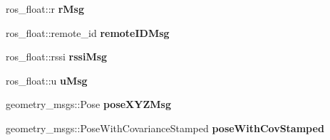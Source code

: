 \begin{DoxyCompactItemize}
\mbox{\label{classUSBL__reader_af8f9a03e453ff6a2e890854a1ac7b40f}} 
ros\+\_\+float\+::r {\bfseries r\+Msg}
\item 
\mbox{\label{classUSBL__reader_a3a9b97cb18160e7aa01631f7f48055d1}} 
ros\+\_\+float\+::remote\+\_\+id {\bfseries remote\+I\+D\+Msg}
\item 
\mbox{\label{classUSBL__reader_ad0dce9112f8e2dcb78255e4a584e321d}} 
ros\+\_\+float\+::rssi {\bfseries rssi\+Msg}
\item 
\mbox{\label{classUSBL__reader_a75c4c86c9ea8e8b73c2405d3928669f7}} 
ros\+\_\+float\+::u {\bfseries u\+Msg}
\item 
\mbox{\label{classUSBL__reader_a27d7c30d8986dfafe241068da2667807}} 
geometry\+\_\+msgs\+::\+Pose {\bfseries pose\+X\+Y\+Z\+Msg}
\item 
\mbox{\label{classUSBL__reader_ac26c28b787458221bee245defb541788}} 
geometry\+\_\+msgs\+::\+Pose\+With\+Covariance\+Stamped {\bfseries pose\+With\+Cov\+Stamped}
\end{DoxyCompactItemize}
